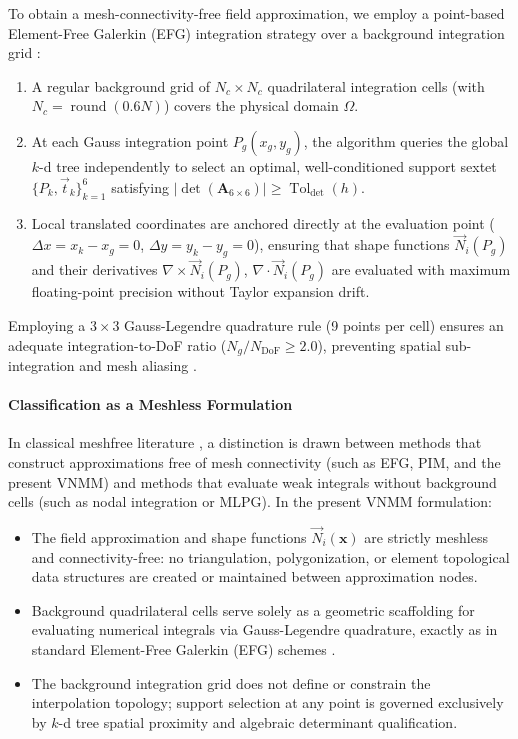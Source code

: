 \documentclass[preprint,12pt]{elsarticle}
\begin{document}
To obtain a mesh-connectivity-free field approximation, we employ a point-based Element-Free Galerkin (EFG) integration strategy over a background integration grid \cite{belytschko1994element, parreira2006efficient}:
\begin{enumerate}
    \item A regular background grid of $N_c \times N_c$ quadrilateral integration cells (with $N_c = \operatorname{round}(0.6 N)$) covers the physical domain $\Omega$.
    \item At each Gauss integration point $P_g(x_g, y_g)$, the algorithm queries the global $k$-d tree independently to select an optimal, well-conditioned support sextet $\{P_k, \vec{t}_k\}_{k=1}^6$ satisfying $|\det(\mathbf{A}_{6 \times 6})| \ge \operatorname{Tol}_{\mathrm{det}}(h)$.
    \item Local translated coordinates are anchored directly at the evaluation point ($\Delta x = x_k - x_g = 0$, $\Delta y = y_k - y_g = 0$), ensuring that shape functions $\vec{N}_i(P_g)$ and their derivatives $\nabla \times \vec{N}_i(P_g)$, $\nabla \cdot \vec{N}_i(P_g)$ are evaluated with maximum floating-point precision without Taylor expansion drift.
\end{enumerate}
Employing a $3 \times 3$ Gauss-Legendre quadrature rule (9 points per cell) ensures an adequate integration-to-DoF ratio ($N_g / N_{\mathrm{DoF}} \ge 2.0$), preventing spatial sub-integration and mesh aliasing \cite{dolbow1999numerical, liu2009mesh}.

\paragraph{Classification as a Meshless Formulation}
In classical meshfree literature \cite{belytschko1994element, atluri2002meshless, liu2009mesh}, a distinction is drawn between methods that construct approximations free of mesh connectivity (such as EFG, PIM, and the present VNMM) and methods that evaluate weak integrals without background cells (such as nodal integration or MLPG). In the present VNMM formulation:
\begin{itemize}
    \item The field approximation and shape functions $\vec{N}_i(\mathbf{x})$ are strictly meshless and connectivity-free: no triangulation, polygonization, or element topological data structures are created or maintained between approximation nodes.
    \item Background quadrilateral cells serve solely as a geometric scaffolding for evaluating numerical integrals via Gauss-Legendre quadrature, exactly as in standard Element-Free Galerkin (EFG) schemes \cite{belytschko1994element, parreira2006efficient}.
    \item The background integration grid does not define or constrain the interpolation topology; support selection at any point is governed exclusively by $k$-d tree spatial proximity and algebraic determinant qualification.
\end{itemize}
\end{document}
